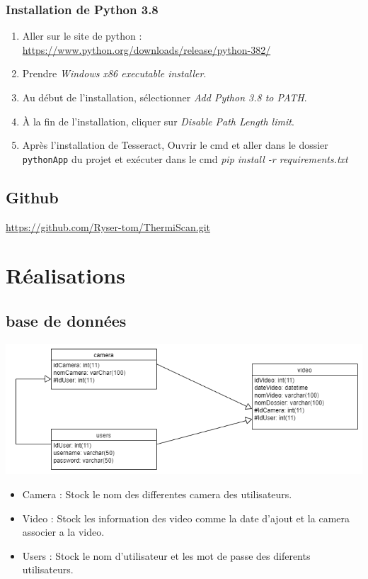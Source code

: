 \documentclass[12pt]{article}
\begin{document}
\subsubsection{Installation de Python 3.8}
    \begin{enumerate}
        \item Aller sur le site de python : \url{https://www.python.org/downloads/release/python-382/}
        \item Prendre \textit{Windows x86 executable installer}.
        \item Au début de l'installation, sélectionner \textit{Add Python 3.8 to PATH}.
        \item À la fin de l'installation, cliquer sur \textit{Disable Path Length limit}.
        \item Après l'installation de Tesseract, Ouvrir le cmd et aller dans le dossier \texttt{pythonApp} du projet et exécuter dans le cmd \textit{pip install -r requirements.txt}
    \end{enumerate}
\subsection{Github}
    \url{https://github.com/Ryser-tom/ThermiScan.git}
\clearpage

\section{Réalisations}
\subsection{base de données}
\includegraphics[scale = 0.5]{diagram.png}\\
\begin{itemize}
        \item Camera : Stock le nom des differentes camera des utilisateurs. 
        \item Video : Stock les information des video comme la date d'ajout et la camera associer a la video.
        \item Users : Stock le nom d'utilisateur et les mot de passe des diferents utilisateurs.
    \end{itemize}
\end{document}
